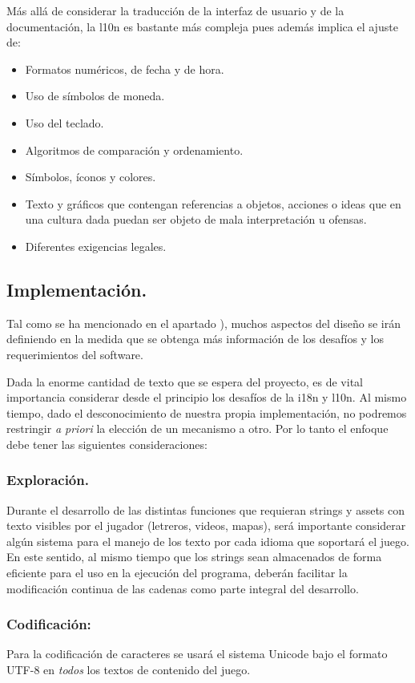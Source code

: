 Más allá de considerar la traducción de la interfaz de usuario y de la documentación, la l10n es bastante más compleja pues además implica el ajuste de:
\begin{itemize}
	\item Formatos numéricos, de fecha y de hora.
	\item Uso de símbolos de moneda.
	\item Uso del teclado.
	\item Algoritmos de comparación y ordenamiento.
	\item Símbolos, íconos y colores.
	\item Texto y gráficos que contengan referencias a objetos, acciones o ideas que en una cultura dada puedan ser objeto de mala interpretación u ofensas.
	\item Diferentes exigencias legales.
\end{itemize}

\subsection{Implementación.}\label{i18n:implementacion}
Tal como se ha mencionado en el apartado ), muchos aspectos del diseño se irán definiendo en la medida que se obtenga más información de los desafíos y los requerimientos del software.

Dada la enorme cantidad de texto que se espera del proyecto, es de vital importancia considerar desde el principio los desafíos de la i18n y l10n.
Al mismo tiempo, dado el desconocimiento de nuestra propia implementación, no podremos restringir \textit{a priori} la elección de un mecanismo a otro. Por lo tanto el enfoque debe tener las siguientes consideraciones:

\subsubsection{Exploración.}\label{i18n:exploracion}
Durante el desarrollo de las distintas funciones que requieran strings y assets con texto visibles por el jugador (letreros, videos, mapas), será importante considerar algún sistema para el manejo de los texto por cada idioma que soportará el juego.
En este sentido, al mismo tiempo que los strings sean almacenados de forma eficiente para el uso en la ejecución del programa, deberán facilitar la modificación continua de las cadenas como parte integral del desarrollo.

\subsubsection{Codificación:}\label{i18n:codificacion}
Para la codificación de caracteres se usará el sistema Unicode bajo el formato UTF-8 en \emph{todos} los textos de contenido del juego.

